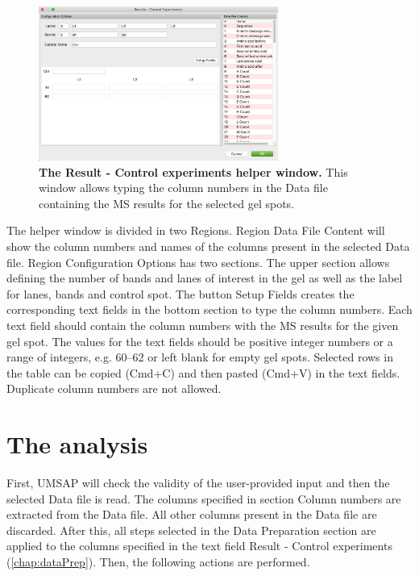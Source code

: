 \begin{figure}[h]
    \centering
    \includegraphics[width=0.7\textwidth]{./IMAGES/MOD-LIMPROT/limprot-rescontrol.jpg}
    \caption[The Result - Control experiments helper window]{\textbf{The Result -
    Control experiments helper window.} This window allows typing the column
    numbers in the Data file containing the MS results for the selected gel spots.} 
    \label{fig:limprotResControlWindow}
    \vspace{-5pt} 	
\end{figure}

The helper window is divided in two Regions. Region Data File Content will show the 
column numbers and names of the columns present in the selected Data file. Region
Configuration Options has two sections. The upper section allows defining the number
of bands and lanes of interest in the gel as well as the label for lanes, bands and
control spot. The button Setup Fields creates the corresponding text fields in the
bottom section to type the column numbers. Each text field should contain the column
numbers with the MS results for the given gel spot. The values for the text fields
should be positive integer numbers or a range of integers, e.g. 
\numrange[range-phrase=--]{60}{62} or left blank for empty gel spots. Selected rows
in the table can be copied (Cmd+C) and then pasted (Cmd+V) in the text fields. 
Duplicate column numbers are not allowed. 

\section{The analysis}
\label{sec:limprotEquivalenceTest}
First, UMSAP will check the validity of the user-provided input and then the selected
Data file is read. The columns specified in section Column numbers are extracted
from the Data file. All other columns present in the Data file are discarded. After
this, all steps selected in the Data Preparation section are applied to the columns
specified in the text field Result - Control experiments (\autoref{chap:dataPrep}).
Then, the following actions are performed.

